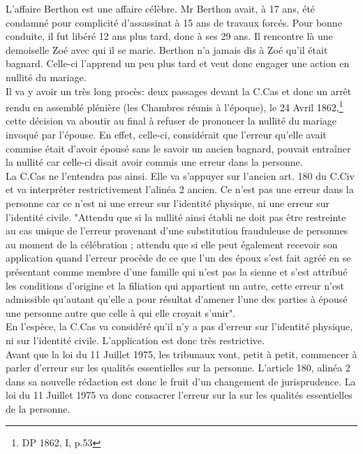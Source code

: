 \documentclass[12pt, a4paper, openany]{book}
\begin{document}
L'affaire Berthon est une affaire célèbre. Mr Berthon avait, à 17 ans, été condamné pour complicité d'assassinat à 15 ans de travaux forcés. Pour bonne conduite, il fut libéré 12 ans plus tard, donc à ses 29 ans. Il rencontre là une demoiselle Zoé avec qui il se marie. Berthon n'a jamais dis à Zoé qu'il était bagnard. Celle-ci l'apprend un peu plus tard et veut donc engager une action en nullité du mariage. \\
Il va y avoir un très long procès: deux passages devant la C.Cas et donc un arrêt rendu en assemblé plénière (les Chambres réunis à l'époque), le 24 Avril 1862,\footnote{DP 1862, I, p.53} cette décision va aboutir au final à refuser de prononcer la nullité du mariage invoqué par l'épouse. En effet, celle-ci, considérait que l'erreur qu'elle avait commise était d'avoir épousé sans le savoir un ancien bagnard, pouvait entraîner la nullité car celle-ci disait avoir commis une erreur dans la personne. \\
La C.Cas ne l'entendra pas ainsi. Elle va s'appuyer sur l'ancien art. 180 du C.Civ et va interpréter restrictivement l'alinéa 2 ancien. Ce n'est pas une erreur dans la personne car ce n'est ni une erreur sur l'identité physique, ni une erreur sur l'identité civile. "Attendu que si la nullité ainsi établi ne doit pas être restreinte au cas unique de l'erreur provenant d'une substitution frauduleuse de personnes au moment de la célébration ; attendu que si elle peut également recevoir son application quand l'erreur procède de ce que l'un des époux s'est fait agréé en se présentant comme membre d'une famille qui n'est pas la sienne et s'est attribué les conditions d'origine et la filiation qui appartient un autre, cette erreur n'est admissible qu'autant qu'elle a pour résultat d'amener l'une des parties à épousé une personne autre que celle à qui elle croyait s'unir". \\
En l'espèce, la C.Cas va considéré qu'il n'y a pas d'erreur sur l'identité physique, ni sur l'identité civile. L'application est donc très restrictive. \\
Avant que la loi du 11 Juillet 1975, les tribunaux vont, petit à petit, commencer à parler d'erreur sur les qualités essentielles sur la personne. L'article 180, alinéa 2 dans sa nouvelle rédaction est donc le fruit d'un changement de jurisprudence. La loi du 11 Juillet 1975 va donc consacrer l'erreur sur la sur les qualités essentielles de la personne.
\end{document}

